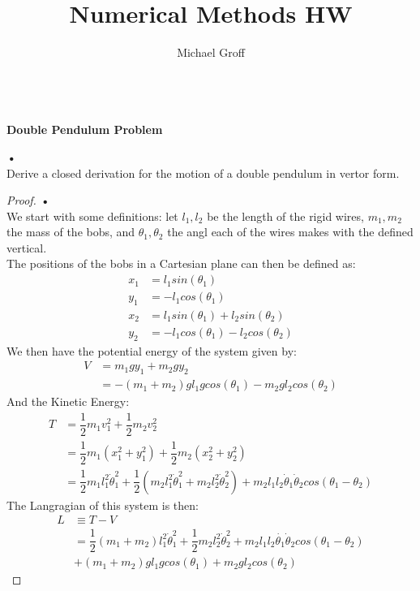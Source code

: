 \documentclass[12pt]{article}
\begin{document}
\title{Numerical Methods HW}
\author{Michael Groff 
}
\maketitle
\text{ }\\
\textbf{Double Pendulum Problem}

\textbf{•}\\
Derive a closed derivation for the motion of a double pendulum in vertor form.

\begin{proof}
\textbf{•}\\
We start with some definitions: let $l_1,l_2$ be the length of the rigid wires, $m_1,m_2$ the mass of the bobs, and $\theta_1, \theta_2$ the angl each of the wires makes with the defined vertical.\\
The positions of the bobs in a Cartesian plane can then be defined as:
\begin{align}
x_1 & = l_1 sin(\theta_1) \\
y_1 & = -l_1 cos(\theta_1)\\
x_2 & = l_1 sin(\theta_1)+l_2 sin(\theta_2)\\
y_2 & = -l_1 cos(\theta_1) - l_2 cos(\theta_2)
\end{align}
We then have the potential energy of the system given by:
\begin{align}
V &= m_1gy_1 + m_2gy_2 \nonumber \\
& = -(m_1+m_2)gl_1gcos(\theta_1) - m_2g l_2cos(\theta_2)
\end{align}
And the Kinetic Energy:
\begin{align}
T &= \dfrac{1}{2}m_1v^2_1 + \dfrac{1}{2}m_2v^2_2 \nonumber \\
&= \dfrac{1}{2}m_1(x^2_1+ y^2_1) + \dfrac{1}{2}m_2(x^2_2+ y^2_2) \nonumber  \\
&= \dfrac{1}{2}m_1l_1^2\dot{\theta}^2_1 + \dfrac{1}{2}(m_2l_1^2\dot{\theta}_1^2 + m_2l_2^2\dot{\theta}_2^2) + m_2l_1l_2\dot{\theta}_1 \dot{\theta}_2 cos(\theta_1 - \theta_2)
\end{align}
The Langragian of this system is then:
\begin{align}
L &\equiv T - V \nonumber \\
&= \dfrac{1}{2}(m_1+m_2)l_1^2\dot{\theta}^2_1 + \dfrac{1}{2}m_2l_2^2\dot{\theta}_2^2 + m_2l_1l_2 \dot{\theta_1}\dot{\theta}_2 cos(\theta_1 - \theta_2) \nonumber \\
&+ (m_1+m_2)gl_1gcos(\theta_1) + m_2g l_2cos(\theta_2)
\end{align}

\end{proof}
\end{document}
